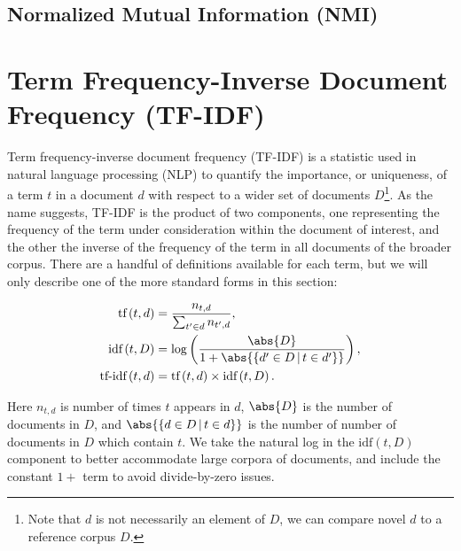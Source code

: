\subsection{Normalized Mutual Information (NMI)}
\label{dim_reduct:MI:normalized}

\section{Term Frequency-Inverse Document Frequency (TF-IDF)}
\label{dim_reduct:tfidf}

Term frequency-inverse document frequency (TF-IDF) is a statistic
used in natural language processing (NLP) to quantify
the importance, or uniqueness, of a term $t$ in a document $d$
with respect to a wider set of documents $D$\footnote{Note that $d$ is not necessarily an element of $D$, we can compare novel $d$ to a reference corpus $D$.}.
As the name suggests, TF-IDF is the product of two components,
one representing the frequency of the term under consideration within the document of interest,
and the other the inverse of the frequency of the term in all documents of the broader corpus.
There are a handful of definitions available for each term, but we will only describe
one of the more standard forms in this section:

\begin{subequations}\label{eq:unsupervised:tfidf}
\begin{align}
\text{tf}\left(t,d\right) &= \frac{n_{t,d}}{\sum_{t' \in d} n_{t',d}}, \label{eq:unsupervised:tfidf:tf} \\
\text{idf}\left(t,D\right) &= \log\left(\frac{\abs{D}}{1 + \abs{\left\{d' \in D \, | \, t \in d'\right\}}}\right), \label{eq:unsupervised:tfidf:idf} \\
\text{tf-idf}\left(t,d\right) &= \text{tf}\left(t,d\right) \times \text{idf}\left(t,D\right). \label{eq:unsupervised:tfidf:tfidf}
\end{align}
\end{subequations}

\noindent Here $n_{t,d}$ is number of times $t$ appears in $d$,
$\abs{D}$ is the number of documents in $D$,
and $\abs{\left\{d \in D \, | \, t \in d\right\}}$ is the number of number of documents in $D$ which contain $t$.
We take the natural log in the $\text{idf}\left(t,D\right)$ component to better accommodate large corpora of documents,
and include the constant $1+$ term to avoid divide-by-zero issues.

